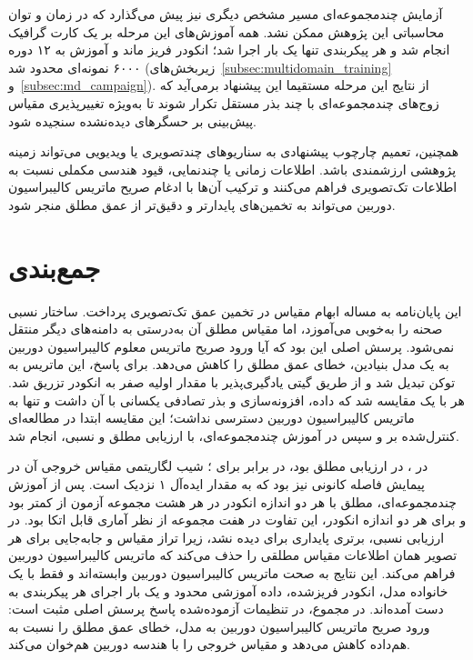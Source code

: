 آزمایش چندمجموعه‌ای مسیر مشخص دیگری نیز پیش می‌گذارد که در زمان و توان محاسباتی این پژوهش ممکن نشد. همه آموزش‌های این مرحله بر یک کارت گرافیک  انجام شد و هر پیکربندی تنها یک بار اجرا شد؛ انکودر  فریز ماند و آموزش به ۱۲ دوره ۶۰۰۰ نمونه‌ای محدود شد (زیربخش‌های~\ref{subsec:multidomain_training} و~\ref{subsec:md_campaign}). از نتایج این مرحله مستقیما این پیشنهاد برمی‌آید که زوج‌های چندمجموعه‌ای با چند بذر مستقل تکرار شوند تا به‌ویژه تغییرپذیری مقیاس پیش‌بینی بر حسگرهای دیده‌نشده سنجیده شود.

همچنین،
تعمیم چارچوب پیشنهادی
به سناریوهای چندتصویری یا ویدیویی
می‌تواند زمینه پژوهشی ارزشمندی باشد.
اطلاعات زمانی یا چندنمایی،
قیود هندسی مکملی نسبت به اطلاعات تک‌تصویری فراهم می‌کنند
و ترکیب آن‌ها با ادغام صریح ماتریس کالیبراسیون دوربین
می‌تواند به تخمین‌های پایدارتر و دقیق‌تر
از عمق مطلق منجر شود.


\section{جمع‌بندی}
\label{sec:chapter5_final_summary}
این پایان‌نامه به مساله ابهام مقیاس در تخمین عمق تک‌تصویری پرداخت. \basemodel{} ساختار نسبی صحنه را به‌خوبی می‌آموزد، اما مقیاس مطلق آن به‌درستی به دامنه‌های دیگر منتقل نمی‌شود. پرسش اصلی این بود که آیا ورود صریح ماتریس معلوم کالیبراسیون دوربین به یک مدل بنیادین، خطای عمق مطلق را کاهش می‌دهد. برای پاسخ، این ماتریس به توکن تبدیل شد و از طریق گیتی یادگیری‌پذیر با مقدار اولیه صفر به انکودر \basemodel{} تزریق شد. هر \proposedmodel{} با یک \controlmodel{} مقایسه شد که داده، افزونه‌سازی و بذر تصادفی یکسانی با آن داشت و تنها به ماتریس کالیبراسیون دوربین دسترسی نداشت؛ این مقایسه ابتدا در مطالعه‌ای کنترل‌شده بر  و سپس در آموزش چندمجموعه‌ای، با ارزیابی مطلق و نسبی، انجام شد.

در \focaljitterconfig{}،  \proposedmodel{} در ارزیابی مطلق  بود، در برابر  برای \controlmodel{}؛ شیب لگاریتمی مقیاس خروجی آن در پیمایش فاصله کانونی نیز  بود که به مقدار ایده‌آل ۱ نزدیک است. پس از آموزش چندمجموعه‌ای،  مطلق \proposedmodel{} با هر دو اندازه انکودر در هر هشت مجموعه آزمون از \controlmodel{} کمتر بود و برای هر دو اندازه انکودر، این تفاوت در هفت مجموعه از نظر آماری قابل اتکا بود. در ارزیابی نسبی، برتری پایداری برای \proposedmodel{} دیده نشد، زیرا تراز مقیاس و جابه‌جایی برای هر تصویر همان اطلاعات مقیاس مطلقی را حذف می‌کند که ماتریس کالیبراسیون دوربین فراهم می‌کند. این نتایج به صحت ماتریس کالیبراسیون دوربین وابسته‌اند و فقط با یک خانواده مدل، انکودر فریزشده، داده آموزشی محدود و یک بار اجرای هر پیکربندی به دست آمده‌اند. در مجموع، در تنظیمات آزموده‌شده پاسخ پرسش اصلی مثبت است: ورود صریح ماتریس کالیبراسیون دوربین به مدل، خطای عمق مطلق را نسبت به \controlmodel{} هم‌داده کاهش می‌دهد و مقیاس خروجی را با هندسه دوربین هم‌خوان می‌کند.
